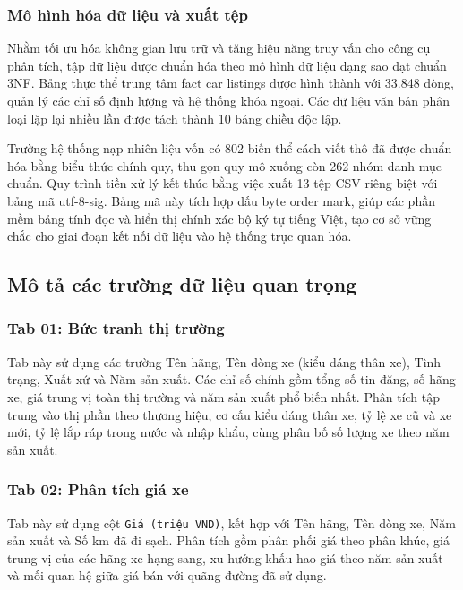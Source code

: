 \subsubsection{Mô hình hóa dữ liệu và xuất tệp}
Nhằm tối ưu hóa không gian lưu trữ và tăng hiệu năng truy vấn cho công cụ phân tích, tập dữ liệu được chuẩn hóa theo mô hình dữ liệu dạng sao đạt chuẩn 3NF. Bảng thực thể trung tâm fact car listings được hình thành với 33.848 dòng, quản lý các chỉ số định lượng và hệ thống khóa ngoại. Các dữ liệu văn bản phân loại lặp lại nhiều lần được tách thành 10 bảng chiều độc lập.

Trường hệ thống nạp nhiên liệu vốn có 802 biến thể cách viết thô đã được chuẩn hóa bằng biểu thức chính quy, thu gọn quy mô xuống còn 262 nhóm danh mục chuẩn. Quy trình tiền xử lý kết thúc bằng việc xuất 13 tệp CSV riêng biệt với bảng mã utf-8-sig. Bảng mã này tích hợp dấu byte order mark, giúp các phần mềm bảng tính đọc và hiển thị chính xác bộ ký tự tiếng Việt, tạo cơ sở vững chắc cho giai đoạn kết nối dữ liệu vào hệ thống trực quan hóa.

\subsection{Mô tả các trường dữ liệu quan trọng}

\subsubsection{Tab 01: Bức tranh thị trường}

Tab này sử dụng các trường Tên hãng, Tên dòng xe (kiểu dáng thân xe), Tình trạng, Xuất xứ và Năm sản xuất. Các chỉ số chính gồm tổng số tin đăng, số hãng xe, giá trung vị toàn thị trường và năm sản xuất phổ biến nhất. Phân tích tập trung vào thị phần theo thương hiệu, cơ cấu kiểu dáng thân xe, tỷ lệ xe cũ và xe mới, tỷ lệ lắp ráp trong nước và nhập khẩu, cùng phân bố số lượng xe theo năm sản xuất.

\subsubsection{Tab 02: Phân tích giá xe}

Tab này sử dụng cột \texttt{Giá (triệu VND)}, kết hợp với Tên hãng, Tên dòng xe, Năm sản xuất và Số km đã đi sạch. Phân tích gồm phân phối giá theo phân khúc, giá trung vị của các hãng xe hạng sang, xu hướng khấu hao giá theo năm sản xuất và mối quan hệ giữa giá bán với quãng đường đã sử dụng.

